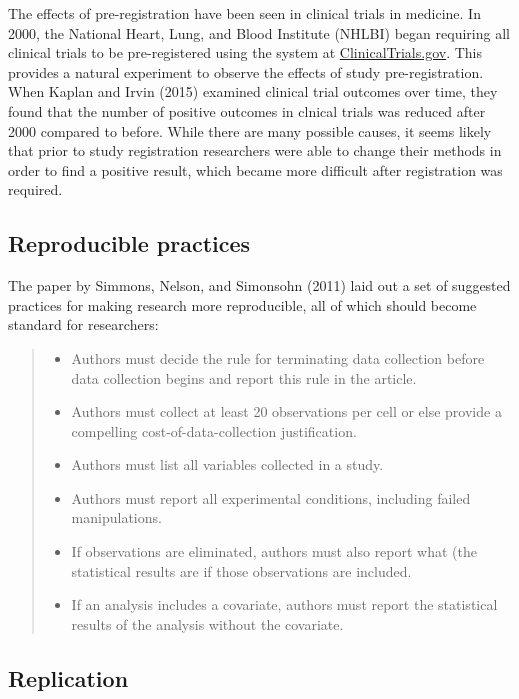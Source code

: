 \documentclass[]{book}
\providecommand{\tightlist}{%
  \setlength{\itemsep}{0pt}\setlength{\parskip}{0pt}}
\theoremstyle{definition}
\theoremstyle{definition}
\theoremstyle{definition}
\theoremstyle{remark}
\begin{document}
The effects of pre-registration have been seen in clinical trials in
medicine. In 2000, the National Heart, Lung, and Blood Institute (NHLBI)
began requiring all clinical trials to be pre-registered using the
system at \href{http://clinicaltrials.gov}{ClinicalTrials.gov}. This
provides a natural experiment to observe the effects of study
pre-registration. When Kaplan and Irvin (2015) examined clinical trial
outcomes over time, they found that the number of positive outcomes in
clnical trials was reduced after 2000 compared to before. While there
are many possible causes, it seems likely that prior to study
registration researchers were able to change their methods in order to
find a positive result, which became more difficult after registration
was required.

\subsection{Reproducible practices}\label{reproducible-practices}

The paper by Simmons, Nelson, and Simonsohn (2011) laid out a set of
suggested practices for making research more reproducible, all of which
should become standard for researchers:

\begin{quote}
\begin{itemize}
\tightlist
\item
  Authors must decide the rule for terminating data collection before
  data collection begins and report this rule in the article.
\item
  Authors must collect at least 20 observations per cell or else provide
  a compelling cost-of-data-collection justification.
\item
  Authors must list all variables collected in a study.
\item
  Authors must report all experimental conditions, including failed
  manipulations.
\item
  If observations are eliminated, authors must also report what (the
  statistical results are if those observations are included.
\item
  If an analysis includes a covariate, authors must report the
  statistical results of the analysis without the covariate.
\end{itemize}
\end{quote}

\subsection{Replication}\label{replication}
\end{document}
